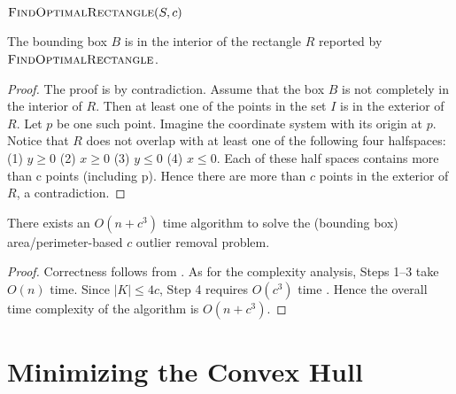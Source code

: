 \documentclass{elsart}
\begin{document}
\noindent
\begin{minipage}{\textwidth}
$\textsc{FindOptimalRectangle}(S,c)$
\begin{algorithmic}[1]
\end{algorithmic}
\end{minipage}

\begin{lem}\label{bounding-box-obs}
 The bounding box $B$ is in the interior of the rectangle $R$ reported
 by $\textsc{FindOptimalRectangle}$.
\end{lem}
\begin{proof}
The proof is by contradiction. 
Assume that the box $B$ is not completely in
the interior of $R$. Then at least one of the points in the set $I$ is in the
exterior of $R$. Let $p$ be one such point. Imagine the coordinate
system with its origin at $p$.
Notice that  $R$ does not overlap with at least one of the following four
halfspaces: (1) $y\ge 0$ (2) $x\ge 0$ (3) $y\le 0$  (4) $x\le 0$.  
Each of these half spaces contains more than c points (including p).
Hence there are more than $c$ points in the exterior of $R$, a contradiction.
\end{proof}

\begin{thm}
There exists an $O(n+c^3)$ time algorithm to solve the 
(bounding box) area/perimeter-based $c$ outlier removal problem.
\end{thm}

\begin{proof}
Correctness follows from . As for the complexity
analysis, Steps 1--3 take $O(n)$ time. Since $|K|\le 4c$, Step 4
requires $O(c^3)$ time \cite{sk98}. Hence the overall
time complexity of the algorithm is $O(n+c^3)$.
\end{proof}

\section{Minimizing the Convex Hull}
\end{document}
